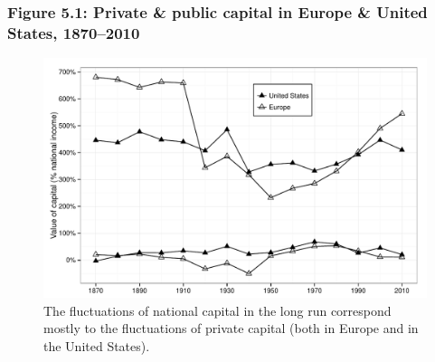 \documentclass[t]{beamer}\usepackage[]{graphicx}\usepackage[]{color}
\newenvironment{knitrout}{}{} %
\begin{document}
\begin{frame}[label=Figure_5_1]
\frametitle{Figure 5.1: Private \& public capital in Europe \& United States, 1870--2010}
\begin{figure}[t]
\begin{minipage}[b]{\textwidth}
\centering
\begin{knitrout}\footnotesize
{}\color{fgcolor}

{\centering \includegraphics[width=1\linewidth]{figures/bw/Figure_5_1} 

}



\end{knitrout}
\caption{The fluctuations of national capital in the long run correspond mostly to the fluctuations of private capital (both in Europe and in the United States).}
\end{minipage}
\end{figure}
\end{frame}
\end{document}
